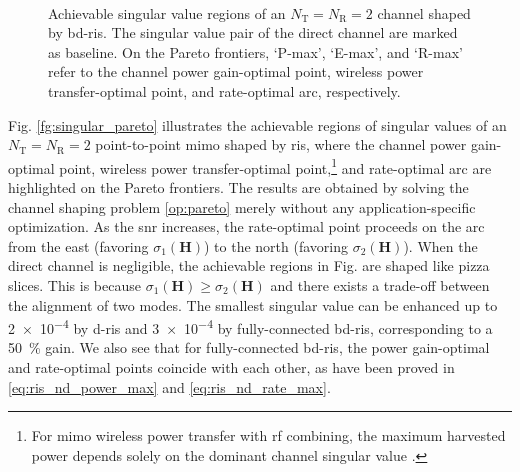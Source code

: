 \documentclass[
	fontsize=11pt,
	paper=a4,
	foldmarks=false
]{scrartcl}
\begin{document}
\begin{reviewer}
{{\begin{figure}[H]
{{					}
				}
				\\
				\caption{Achievable singular value regions of an $N_\mathrm{T}=N_\mathrm{R}=2$ channel shaped by \gls{bd}-\gls{ris}. The singular value pair of the direct channel are marked as baseline.
				On the Pareto frontiers, `P-max', `E-max', and `R-max' refer to the channel power gain-optimal point, wireless power transfer-optimal point, and rate-optimal arc, respectively.}
			\end{figure}
			Fig. \ref{fg:singular_pareto} illustrates the achievable regions of singular values of an $N_\mathrm{T}=N_\mathrm{R}=2$ point-to-point \gls{mimo} shaped by \gls{ris}, where the channel power gain-optimal point, wireless power transfer-optimal point,\footnote{For \gls{mimo} wireless power transfer with \gls{rf} combining, the maximum harvested power depends solely on the dominant channel singular value \cite{Shen2021}.} and rate-optimal arc are highlighted on the Pareto frontiers.
			The results are obtained by solving the channel shaping problem \eqref{op:pareto} merely without any application-specific optimization.
			As the \gls{snr} increases, the rate-optimal point proceeds on the arc from the east (favoring $\sigma_1(\mathbf{H})$) to the north (favoring $\sigma_2(\mathbf{H})$).
			When the direct channel is negligible, the achievable regions in Fig.  are shaped like pizza slices.
			This is because $\sigma_1(\mathbf{H}) \ge \sigma_2(\mathbf{H})$ and there exists a trade-off between the alignment of two modes.
			The smallest singular value can be enhanced up to \num{2e-4} by \gls{d}-\gls{ris} and \num{3e-4} by fully-connected \gls{bd}-\gls{ris}, corresponding to a \qty{50}{\percent} gain.
			We also see that for fully-connected \gls{bd}-\gls{ris}, the power gain-optimal and rate-optimal points coincide with each other, as have been proved in  \eqref{eq:ris_nd_power_max} and \eqref{eq:ris_nd_rate_max}.
}}
\end{reviewer}
\end{document}
